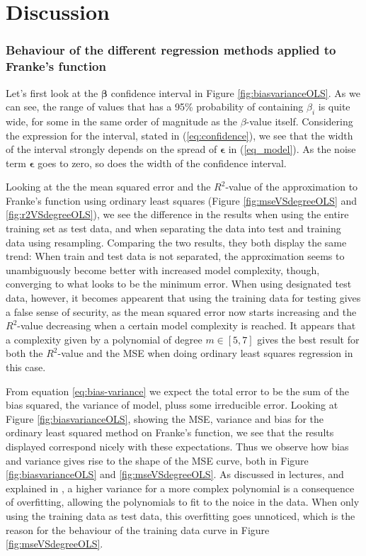 \section{Discussion}
\label{sec:discussion}

\subsubsection*{Behaviour of the different regression methods applied to Franke's function}
Let's first look at the $\boldsymbol{\beta}$ confidence interval in Figure \ref{fig:biasvarianceOLS}. As we can see, the range of values that has a 95\% probability of containing $\beta_i$ is quite wide, for some in the same order of magnitude as the $\beta$-value itself. Considering the expression for the interval, stated in (\ref{eq:confidence}), we see that the width of the interval strongly depends on the spread of $\boldsymbol{\epsilon}$ in (\ref{eq_model}). As the noise term $\boldsymbol{\epsilon}$ goes to zero, so does the width of the confidence interval.  

Looking at the  the mean squared error and the $R^2$-value of the approximation to Franke's function using ordinary least squares (Figure \ref{fig:mseVSdegreeOLS} and \ref{fig:r2VSdegreeOLS}), we see the difference in the results when using the entire training set as test data, and when separating the data into test and training data using resampling. Comparing the two results, they both display the same trend: When train and test data is not separated, the approximation seems to unambiguously become better with increased model complexity, though, converging to what looks to be the minimum error. When using designated test data, however, it becomes appearent that using the training data for testing gives a false sense of security, as the mean squared error now starts increasing and the $R^2$-value decreasing when a certain model complexity is reached. It appears that a complexity given by a polynomial of degree $m \in [5,7]$ gives the best result for both the $R^2$-value and the MSE when doing ordinary least squares regression in this case.

From equation \eqref{eq:bias-variance} we expect the total error to be the sum of the bias squared, the variance of model, pluss some irreducible error. Looking at Figure \ref{fig:biasvarianceOLS}, showing the MSE, variance and bias for the ordinary least squared method on Franke's function, we see that the results displayed correspond nicely with these expectations. Thus we observe how bias and variance gives rise to the shape of the MSE curve, both in Figure \ref{fig:biasvarianceOLS} and \ref{fig:mseVSdegreeOLS}. As discussed in lectures, and explained in \cite{hastie2009elements}, a higher variance for a more complex polynomial is a consequence of overfitting, allowing the polynomials to fit to the noice in the data. When only using the training data as test data, this overfitting goes unnoticed, which is the reason for the behaviour of the training data curve in Figure \ref{fig:mseVSdegreeOLS}.

